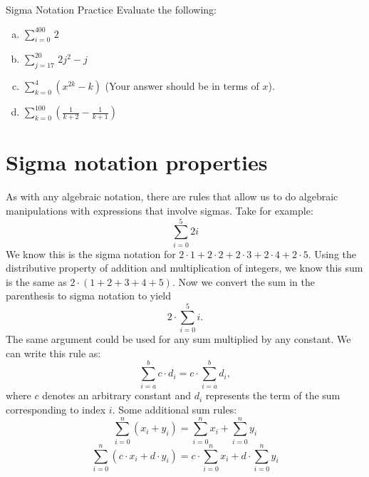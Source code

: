 \begin{exercise}{Sigma Notation Practice}
Evaluate the following:
\begin {enumerate}[(a)]
\item
$\displaystyle{\sum _{i=0}^{400} \,2}$
\item
$\displaystyle{ \sum_{j=17}^{20} \, 2j^2 - j}$
\item
$\displaystyle{ \sum_{k=0}^{4}(x^{2k} - k)}$  \quad (Your answer should be in terms of  $x$).
\item
$\displaystyle{ \sum_{k=0}^{100} \left(\frac{1}{k+2} - \frac{1}{k+1}\right)}$
\end {enumerate}
\end{exercise}

\section{Sigma notation properties}

As with any algebraic notation, there are rules that allow us to do algebraic manipulations with expressions that involve sigmas. 
Take for example:
\[\sum_{i=0}^{5}2i\]
We know this is the sigma notation for $2\cdot1+2\cdot2+2\cdot3+2\cdot4+2\cdot5$. Using the distributive property of addition and multiplication of integers, we know this sum is the same as $2\cdot(1+2+3+4+5)$.  Now we convert the sum in the parenthesis to sigma notation to yield
\[2\cdot\sum_{i=0}^{5}i.\]
The same argument could be used for any sum  multiplied by any constant. We can write this rule as:
\[\sum_{i=a}^{b} c \cdot d_i = c \cdot \sum_{i=a}^{b}  d_i,\]
where $c$ denotes an arbitrary constant and $d_i$ represents the term of the sum corresponding to index $i$.
Some additional sum rules:
\[ \sum_{i=0}^n \left(x_i +y_i \right) = \sum_{i=0}^n x_i + \sum_{i=0}^n y_i \]
\[ \sum_{i=0}^n \left(c \cdot x_i + d \cdot y_i \right) = c \cdot \sum_{i=0}^n x_i + d \cdot \sum_{i=0}^n y_i \]

